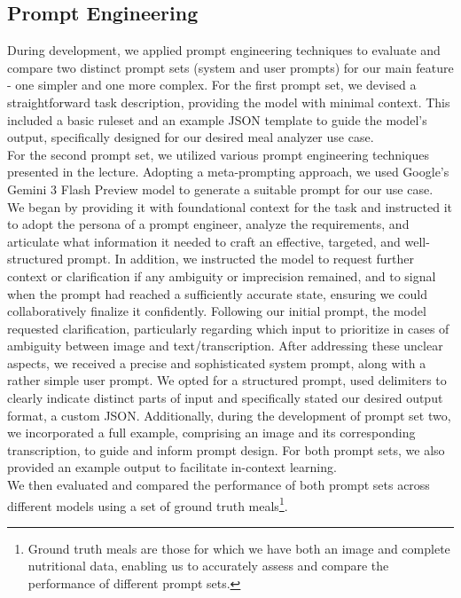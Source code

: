 \documentclass[11pt,a4paper]{article}
\begin{document}
\subsection{Prompt Engineering}
During development, we applied prompt engineering techniques to evaluate and compare two distinct prompt sets (system and user prompts) for our main feature - one simpler and one more complex.
For the first prompt set, we devised a straightforward task description, providing the model with minimal context. This included a basic ruleset and an example JSON template to guide the model’s output, specifically designed for our desired meal analyzer use case. \\
\noindent
For the second prompt set, we utilized various prompt engineering techniques presented in the lecture.
Adopting a meta-prompting approach, we used Google’s Gemini 3 Flash Preview model to generate a suitable prompt for our use case. We began by providing it with foundational context for the task and instructed it to adopt the persona of a prompt engineer, analyze the requirements, and articulate what information it needed to craft an effective, targeted, and well-structured prompt. In addition, we instructed the model to request further context or clarification if any ambiguity or imprecision remained, and to signal when the prompt had reached a sufficiently accurate state, ensuring we could collaboratively finalize it confidently. Following our initial prompt, the model requested clarification, particularly regarding which input to prioritize in cases of ambiguity between image and text/transcription. After addressing these unclear aspects, we received a precise and sophisticated system prompt, along with a rather simple user prompt. We opted for a structured prompt, used delimiters to clearly indicate distinct parts of input and specifically stated our desired output format, a custom JSON. Additionally, during the development of prompt set two, we incorporated a full example, comprising an image and its corresponding transcription, to guide and inform prompt design. For both prompt sets, we also provided an example output to facilitate in-context learning.\\
\noindent
We then evaluated and compared the performance of both prompt sets across different models using a set of ground truth meals\footnote{Ground truth meals are those for which we have both an image and complete nutritional data, enabling us to accurately assess and compare the performance of different prompt sets.}.
\\
\noindent
\end{document}
